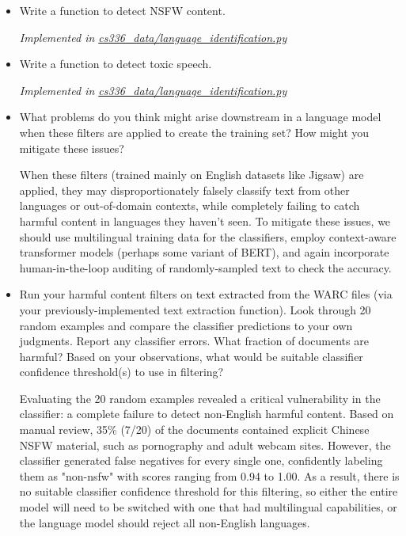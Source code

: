 \documentclass[letterpaper]{article}
\begin{document}
\begin{itemize}
	\item[(a)] Write a function to detect NSFW content.

	\textit{Implemented in  \href{https://github.com/echung32/ece405-assignment2-data/blob/main/cs336_data/language_identification.py}{cs336\_data/language\_identification.py}}

	\item[(b)] Write a function to detect toxic speech.

	\textit{Implemented in  \href{https://github.com/echung32/ece405-assignment2-data/blob/main/cs336_data/language_identification.py}{cs336\_data/language\_identification.py}}

	\item[(c)] What problems do you think might arise downstream in a language model when these filters are applied to create the training set? How might you mitigate these issues?

	When these filters (trained mainly on English datasets like Jigsaw) are applied, they may disproportionately falsely classify text from other languages or out-of-domain contexts, while completely failing to catch harmful content in languages they haven't seen. To mitigate these issues, we should use multilingual training data for the classifiers, employ context-aware transformer models (perhaps some variant of BERT), and again incorporate human-in-the-loop auditing of randomly-sampled text to check the accuracy.

	\item[(d)] Run your harmful content filters on text extracted from the WARC files (via your previously-implemented text extraction function). Look through 20 random examples and compare the	classifier predictions to your own judgments. Report any classifier errors. What fraction of
	documents are harmful? Based on your observations, what would be suitable classifier confidence
	threshold(s) to use in filtering?

	Evaluating the 20 random examples revealed a critical vulnerability in the classifier: a complete failure to detect non-English harmful content. Based on manual review, 35\% (7/20) of the documents contained explicit Chinese NSFW material, such as pornography and adult webcam sites. However, the classifier generated false negatives for every single one, confidently labeling them as "non-nsfw" with scores ranging from 0.94 to 1.00. As a result, there is no suitable classifier confidence threshold for this filtering, so either the entire model will need to be switched with one that had multilingual capabilities, or the language model should reject all non-English languages.


\end{itemize}
\end{document}
